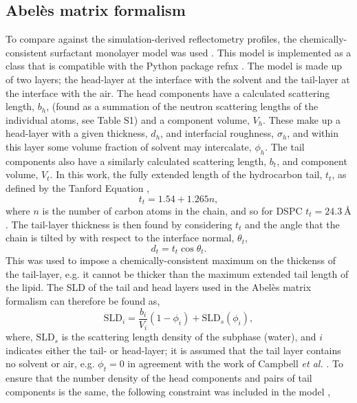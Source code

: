 \documentclass[amsmath,amssymb,twocolumn,superscriptaddress]{revtex4-1}
\begin{document}
\subsection{Abel\`{e}s matrix formalism}
To compare against the simulation-derived reflectometry profiles, the chemically-consistent surfactant monolayer model was used \cite{McCluskey2018,McCluskey2018a}.
This model is implemented as a class that is compatible with the Python package refnx \cite{Nelson2018,refnx}.
The model is made up of two layers; the head-layer at the interface with the solvent and the tail-layer at the interface with the air.
The head components have a calculated scattering length, $b_h$, (found as a summation of the neutron scattering lengths of the individual atoms, see Table S1) and a component volume, $V_h$.
These make up a head-layer with a given thickness, $d_h$, and interfacial roughness, $\sigma_h$, and within this layer some volume fraction of solvent may intercalate, $\phi_h$.
The tail components also have a similarly calculated scattering length, $b_t$, and component volume, $V_t$.
In this work, the fully extended length of the hydrocarbon tail, $t_t$, as defined by the Tanford Equation \cite{Tanford1980},
%
\begin{equation}
  t_t = 1.54 + 1.265n,
\end{equation}
%
where $n$ is the number of carbon atoms in the chain, and so for DSPC $t_t = \SI{24.3}{\angstrom}$.
The tail-layer thickness is then found by considering $t_t$ and the angle that the chain is tilted by with respect to the interface normal, $\theta_t$,
%
\begin{equation}
  d_t = t_t\cos{\theta_t}.
\end{equation}
%
This was used to impose a chemically-consistent maximum on the thickenss of the tail-layer, e.g. it cannot be thicker than the maximum extended tail length of the lipid.
The SLD of the tail and head layers used in the Abel\`{e}s matrix formalism can therefore be found as,
%
\begin{equation}
  \text{SLD}_i = \frac{b_i}{V_i}(1 - \phi_i) + \text{SLD}_s(\phi_i),
\end{equation}
%
where, $\text{SLD}_s$ is the scattering length density of the subphase (water), and $i$ indicates either the tail- or head-layer; it is assumed that the tail layer contains no solvent or air, e.g. $\phi_t = 0$ in agreement with the work of Campbell \emph{et al.} \cite{Campbell2018}.
To ensure that the number density of the head components and pairs of tail components is the same, the following constraint was included in the model \cite{Braun2017},
\end{document}
